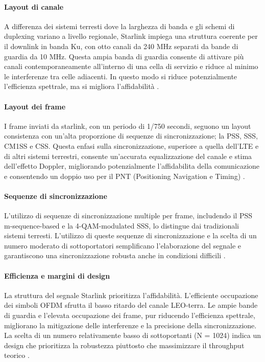 \paragraph{Layout di canale} A differenza dei sistemi terresti dove la larghezza di banda e gli schemi di duplexing variano a livello regionale, Starlink impiega una struttura coerente per il downlink in banda Ku, con otto canali da 240 MHz separati da bande di guardia da 10 MHz.
Questa ampia banda di guardia consente di attivare più canali contemporaneamente all'interno di una cella di servizio e riduce al minimo le interferenze tra celle adiacenti.
In questo modo si riduce potenzialmente l'efficienza spettrale, ma si migliora l'affidabilità \cite{humphreys_signal_2023}.

\paragraph{Layout dei frame}
I frame inviati da starlink, con un periodo di 1/750 secondi, seguono un layout consistenza con un'alta proporzione di sequenze di sincronizzazione; la PSS, SSS, CM1SS e CSS.
Questa enfasi sulla sincronizzazione, superiore a quella dell'LTE e di altri sistemi terrestri, consente un'accurata equalizzazione del canale e stima dell'effetto Doppler, migliorando potenzialmente l'affidabilita della comunicazione e consentendo un doppio uso per il PNT (Positioning Navigation e Timing) \cite{humphreys_signal_2023}.

\paragraph{Sequenze di sincronizzazione}
L'utilizzo di sequenze di sincronizzazione multiple per frame, includendo il PSS m-sequence-based e la 4-\ac{QAM}-modulated SSS, lo distingue dai tradizionali sistemi terresti.
L'utilizzo di queste sequenze di sincronizzazione e la scelta di un numero moderato di sottoportatori semplificano l'elaborazione del segnale e garantiscono una sincronizzazione robusta anche in condizioni difficili \cite{humphreys_signal_2023}.

\paragraph{Efficienza e margini di design}
La struttura del segnale Starlink prioritizza l'affidabilità.
L'efficiente occupazione dei simboli OFDM sfrutta il basso ritardo del canale \ac{LEO}-terra.
Le ampie bande di guardia e l'elevata occupazione dei frame, pur riducendo l'efficienza spettrale, migliorano la mitigazione delle interferenze e la precisione della sincronizzazione.
La scelta di un numero relativamente basso di sottoportanti (N = 1024) indica un design che prioritizza la robustezza piuttosto che massimizzare il throughput teorico \cite{humphreys_signal_2023}.

